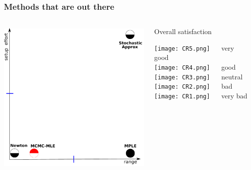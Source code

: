 \documentclass[ 10pt]{beamer}
\begin{document}
\frame
{
\frametitle{Methods that are out there}
\begin{columns}[]
\begin{column}[T]{0.7\textwidth}
\includegraphics[height=3in]{mck-final.pdf}
\end{column}
\begin{column}[t]{0.3\textwidth}
Overall satisfaction
\vspace{1mm}

\texttt{[image: CR5.png]} $\quad$ very good\\
\vspace{1mm}
\texttt{[image: CR4.png]} $\quad$ good\\
\vspace{1mm}
\texttt{[image: CR3.png]} $\quad$ neutral\\
\vspace{1mm}
\texttt{[image: CR2.png]} $\quad$ bad\\
\vspace{1mm}
\texttt{[image: CR1.png]} $\quad$ very bad\\

\end{column}
\end{columns}
}
\end{document}

